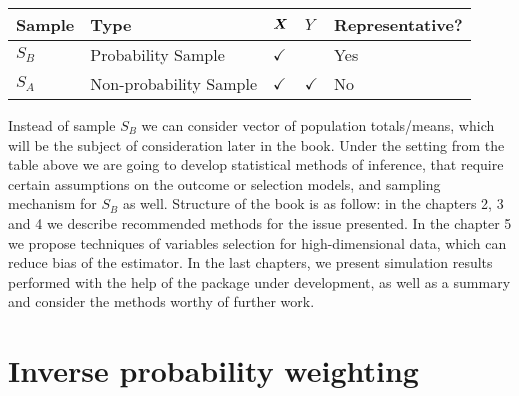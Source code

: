 \documentclass[
  letterpaper,
  DIV=11,
  numbers=noendperiod]{scrreprt}
\begin{document}
\begin{longtable}[]{@{}
  >{\centering\arraybackslash}p{}
  >{\centering\arraybackslash}p{}
  >{\centering\arraybackslash}p{}
  >{\centering\arraybackslash}p{}
  >{\centering\arraybackslash}p{}@{}}
\toprule\noalign{}
\begin{minipage}[b]{\linewidth}\centering
Sample
\end{minipage} & \begin{minipage}[b]{\linewidth}\centering
Type
\end{minipage} & \begin{minipage}[b]{\linewidth}\centering
\(\boldsymbol{X}\)
\end{minipage} & \begin{minipage}[b]{\linewidth}\centering
\(Y\)
\end{minipage} & \begin{minipage}[b]{\linewidth}\centering
Representative?
\end{minipage} \\
\midrule\noalign{}
\endhead
\bottomrule\noalign{}
\endlastfoot
\(S_B\) & Probability Sample & \(\checkmark\) & & Yes \\
\(S_A\) & Non-probability Sample & \(\checkmark\) & \(\checkmark\) &
No \\
\end{longtable}

Instead of sample \(S_B\) we can consider vector of population
totals/means, which will be the subject of consideration later in the
book. Under the setting from the table above we are going to develop
statistical methods of inference, that require certain assumptions on
the outcome or selection models, and sampling mechanism for \(S_B\) as
well. Structure of the book is as follow: in the chapters 2, 3 and 4 we
describe recommended methods for the issue presented. In the chapter 5
we propose techniques of variables selection for high-dimensional data,
which can reduce bias of the estimator. In the last chapters, we present
simulation results performed with the help of the package under
development, as well as a summary and consider the methods worthy of
further work.


\chapter{Inverse probability
weighting}\label{inverse-probability-weighting}
\end{document}
